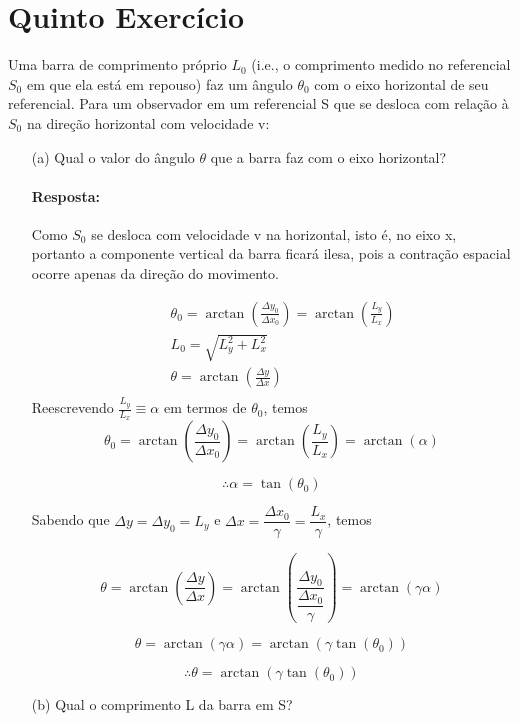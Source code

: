 \documentclass[10pt,a4paper]{article}
\begin{document}
	\section{Quinto Exercício}
	Uma barra de comprimento próprio $ L_0 $ (i.e., o comprimento medido no referencial $ S_0 $ em que ela está em repouso) faz um ângulo $ \theta_0 $ com o eixo
	horizontal de seu referencial. Para um observador em um referencial S que se desloca com relação à $ S_0 $ na direção horizontal com velocidade v:
	\begin{enumerate}
		\item[(a)] Qual o valor do ângulo $ \theta $ que a barra faz com o eixo horizontal?
		
		\paragraph{Resposta:}
		Como $ S_0 $ se desloca com velocidade v na horizontal, isto é, no eixo x, portanto a componente vertical da barra ficará ilesa, pois a contração espacial ocorre apenas da direção do movimento.
		
		\begin{eqnarray}
			&& \theta_0 = \arctan\left(\frac{\Delta y_0}{\Delta x_0}\right) = \arctan\left(\frac{L_y}{L_x}\right)\nonumber \\
			&& L_0 = \sqrt{L_y^2+L_x^2} \nonumber\\
			&& \theta = \arctan\left(\frac{\Delta y}{\Delta x}\right) \nonumber \\
		\end{eqnarray}
		 Reescrevendo $ \frac{L_y}{L_x} \equiv \alpha$ em termos de $ \theta_0 $, temos
		 $$\theta_0 = \arctan\left(\frac{\Delta y_0}{\Delta x_0}\right) = \arctan\left(\frac{L_y}{L_x}\right) =  \arctan (\alpha)$$
		 
		 $$\therefore \alpha = \tan (\theta_0)$$
		 
		 Sabendo que $ \Delta y = \Delta y_0 = L_y $ e $\Delta x = \dfrac{\Delta x_0}{\gamma} =\dfrac{L_x}{\gamma} $, temos
		 
		 $$ \theta = \arctan\left(\frac{\Delta y}{\Delta x}\right) = \arctan\left(\frac{\Delta y_0}{ \dfrac{\Delta x_0}{\gamma}}\right) = \arctan(\gamma\alpha)$$
		 
		 $$\theta = \arctan(\gamma\alpha) = \arctan(\gamma\tan (\theta_0))$$
		 
		$$ \therefore \theta  = \arctan(\gamma\tan (\theta_0))$$
		
		\item[(b)] Qual o comprimento L da barra em S?

\end{enumerate}
\end{document}

